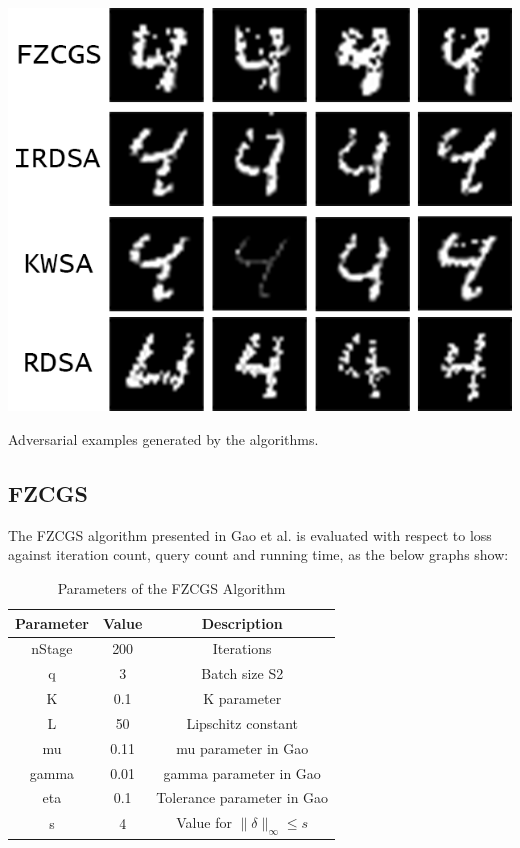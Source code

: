 \documentclass[10pt,twocolumn,letterpaper]{article}
\begin{document}
\begin{center}
   \includegraphics*[scale=1]{img/mnist_comparison.png}
\end{center}

\begin{center}
   \small{Adversarial examples generated by the algorithms.}
\end{center}

\subsection{FZCGS}

The FZCGS algorithm presented in Gao et al.\cite{Gao} is evaluated with respect to 
loss against iteration count, query count and running time, as the below graphs show:

\begin{table}[h]
   \centering
   \begin{tabular}{ccc}
       \hline
       \textbf{Parameter} & \textbf{Value} & \textbf{Description} \\
       \hline
       nStage & 200 & Iterations\\
       \hline
       q & 3 & Batch size S2\\
       \hline
       K & 0.1 & K parameter\\
       \hline
       L & 50 & Lipschitz constant \\
       \hline
       mu & 0.11 & mu parameter in Gao\\
       \hline
       gamma & 0.01 & gamma parameter in Gao\\
       \hline
       eta & 0.1 & Tolerance parameter in Gao\\
       \hline
       s & 4 & Value for $\|\delta\|_{\infty} \leq s$\\
       \hline
   \end{tabular}
   \
   \caption{Parameters of the FZCGS Algorithm} 
   \label{tab:fzcgs_params}
\end{table}
\end{document}
